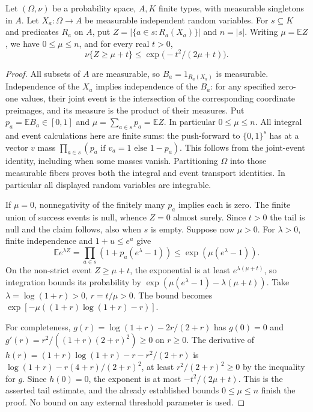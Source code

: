 \begin{lemma}
Let $(\Omega,\nu)$ be a probability space, $A,K$ finite types, with
measurable singletons in $A$. Let $X_a:\Omega\to A$ be measurable
independent random variables. For $s\subseteq K$ and predicates $R_a$
on $A$, put $Z=|\{a\in s:R_a(X_a)\}|$ and $n=|s|$.
Writing $\mu=\mathbb EZ$, we have $0\le\mu\le n$, and for every real $t>0$,
\[
\nu\{Z\ge\mu+t\}\le\exp\bigl(-t^2/(2\mu+t)\bigr).
\]
\end{lemma}
\begin{proof}
All subsets of $A$ are measurable, so $B_a=1_{R_a(X_a)}$ is measurable.
Independence of the $X_a$ implies independence of the $B_a$: for any
specified zero-one values, their joint event is the intersection of the
corresponding coordinate preimages, and its measure is the product of
their measures. Put $p_a=\mathbb EB_a\in[0,1]$ and
$\mu=\sum_{a\in s}p_a=\mathbb EZ$. In particular $0\le\mu\le n$.
All integral and event calculations here are finite sums: the push-forward
to $\{0,1\}^s$ has at a vector $v$ mass
$\prod_{a\in s}(p_a\text{ if }v_a=1\text{ else }1-p_a)$.
This follows from the joint-event identity, including when some masses
vanish. Partitioning $\Omega$ into those measurable fibers proves both
the integral and event transport identities. In particular all displayed
random variables are integrable.

If $\mu=0$, nonnegativity of the finitely many $p_a$ implies each is zero.
The finite union of success events is null, whence $Z=0$ almost surely.
Since $t>0$ the tail is null and the claim follows, also when $s$ is empty.
Suppose now $\mu>0$. For $\lambda>0$, finite independence and
$1+u\le e^u$ give
\[
\mathbb E e^{\lambda Z}
=\prod_{a\in s}(1+p_a(e^\lambda-1))
\le \exp(\mu(e^\lambda-1)).
\]
On the non-strict event $Z\ge\mu+t$, the exponential is at least
$e^{\lambda(\mu+t)}$, so integration bounds its probability by
$\exp(\mu(e^\lambda-1)-\lambda(\mu+t))$.
Take $\lambda=\log(1+r)>0$, $r=t/\mu>0$. The bound becomes
$\exp[-\mu((1+r)\log(1+r)-r)]$.

For completeness, $g(r)=\log(1+r)-2r/(2+r)$ has $g(0)=0$ and
$g'(r)=r^2/((1+r)(2+r)^2)\ge0$ on $r\ge0$.
The derivative of
$h(r)=(1+r)\log(1+r)-r-r^2/(2+r)$ is
$\log(1+r)-r(4+r)/(2+r)^2$, at least
$r^2/(2+r)^2\ge0$ by the inequality for $g$.
Since $h(0)=0$, the exponent is at most $-t^2/(2\mu+t)$.
This is the asserted tail estimate, and the already established bounds
$0\le\mu\le n$ finish the proof. No bound on any external threshold
parameter is used.
\end{proof}
